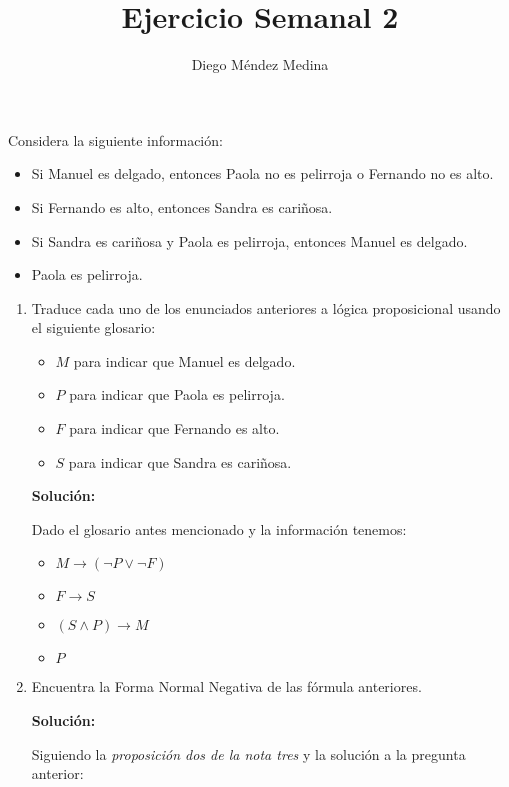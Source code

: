 \documentclass[8pt, letterpaper]{article}
\title{%
  Ejercicio Semanal 2\\
  {\large{}}}
\author{Diego Méndez Medina}
\date{}
\begin{document}
\ttfamily
\maketitle
\rmfamily
Considera la siguiente información:

\begin{itemize}
\item Si Manuel es delgado, entonces Paola no es pelirroja o Fernando no es alto.
\item Si Fernando es alto, entonces Sandra es cariñosa.
\item Si Sandra es cariñosa y Paola es pelirroja, entonces Manuel es delgado.
\item Paola es pelirroja.
\end{itemize}

\begin{enumerate}
\item Traduce cada uno de los enunciados anteriores a lógica proposicional usando el siguiente glosario:
  \begin{itemize}
  \item $M$ para indicar que Manuel es delgado.
  \item $P$ para indicar que Paola es pelirroja.
  \item $F$ para indicar que Fernando es alto.
  \item $S$ para indicar que Sandra es cariñosa.
  \end{itemize}

  \hfill\break
  \ttfamily
  {\bf Solución:}
      
  Dado el glosario antes mencionado y la información tenemos:
  \begin{itemize}
  \item $M\rightarrow (\neg P \lor \neg F)$
  \item $F\rightarrow S$
  \item $(S\land P) \rightarrow M$
  \item $P$
  \end{itemize}
  \rmfamily
\item Encuentra la Forma Normal Negativa de las fórmula anteriores.
  
  \hfill\break
  \ttfamily
  {\bf Solución:}
      
  Siguiendo la \textit{proposición dos de la nota tres} y la solución a la
  pregunta anterior:
  

\end{enumerate}
\end{document}
